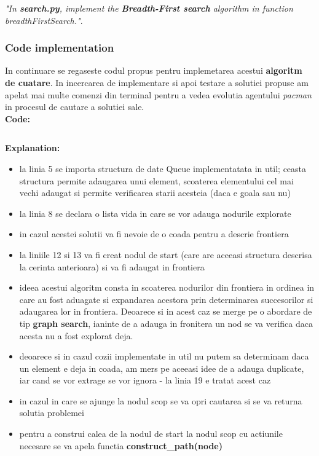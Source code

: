 \textit{"In \textbf{search.py}, implement the \textbf{Breadth-First search} algorithm in function \textit{breadthFirstSearch}."}.


\subsubsection{Code implementation}
In continuare se regaseste codul propus pentru implemetarea acestui \textbf{algoritm de cuatare}. In incercarea de implementare si apoi testare a solutiei propuse am apelat mai multe comenzi din terminal pentru a vedea evolutia agentului \textit{pacman} in procesul de cautare a solutiei sale.   \newline    \\


\textbf{Code:}
\inputminted[linenos]{python}{code/02_bfs.py}


\textbf{Explanation:}
\begin{itemize}
    \setlength\itemsep{0em}
    \item la linia 5 se importa structura de date Queue implementatata in util; ceasta structura permite adaugarea unui element, scoaterea elementului cel mai vechi adaugat si permite verificarea starii acesteia (daca e goala sau nu)
    \item la linia 8 se declara o lista vida in care se vor adauga nodurile explorate 
    \item in cazul acestei solutii va fi nevoie de o coada pentru a descrie frontiera 
    \item la liniile 12 si 13 va fi creat nodul de start (care are aceeasi structura descrisa la cerinta anterioara) si va fi adaugat in frontiera
    \item ideea acestui algoritm consta in scoaterea nodurilor din frontiera in ordinea in care au fost aduagate si expandarea acestora prin determinarea succesorilor si adaugarea lor in frontiera. Deoarece si in acest caz se merge pe o abordare de tip \textbf{graph search}, ianinte de a adauga in fronitera un nod se va verifica daca acesta nu a fost explorat deja.
    \item deoarece si in cazul cozii implementate in util nu putem sa determinam daca un element e deja in coada, am mers pe aceeasi idee de a adauga duplicate, iar cand se vor extrage se vor ignora - la linia 19 e tratat acest caz
    \item in cazul in care se ajunge la nodul scop se va opri cautarea si se va returna solutia problemei
    \item pentru a construi calea de la nodul de start la nodul scop cu actiunile necesare se va apela functia \textbf{construct\_path(node)}

\end{itemize}


